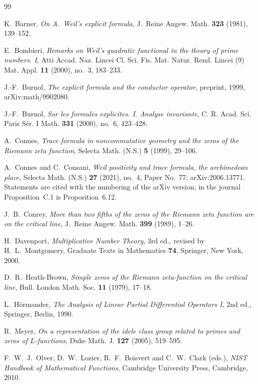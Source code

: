 \documentclass[11pt]{amsart}
\theoremstyle{remark}
\numberwithin{equation}{section}
\begin{document}
\begin{thebibliography}{99}

 K.~Barner,
\emph{On A.~Weil's explicit formula},
J.~Reine Angew. Math. \textbf{323} (1981), 139--152.

E.~Bombieri, \emph{Remarks on Weil's quadratic functional in the theory of
prime numbers. I}, Atti Accad. Naz. Lincei Cl. Sci. Fis. Mat. Natur. Rend.
Lincei (9) Mat. Appl. \textbf{11} (2000), no.~3, 183--233.

J.-F.~Burnol, \emph{The explicit formula and the conductor operator},
preprint, 1999, arXiv:math/9902080.

J.-F.~Burnol, \emph{Sur les formules explicites. I. Analyse invariante},
C. R. Acad. Sci. Paris S\'er. I Math. \textbf{331} (2000), no.~6, 423--428.

 A.~Connes,
\emph{Trace formula in noncommutative geometry and the zeros of the Riemann
zeta function}, Selecta Math. (N.S.) \textbf{5} (1999), 29--106.

A.~Connes and C.~Consani, \emph{Weil positivity and trace formula, the
archimedean place}, Selecta Math. (N.S.) \textbf{27} (2021), no.~4, Paper
No.~77; arXiv:2006.13771.  Statements are cited with the numbering of the
arXiv version; in the journal Proposition~C.1 is Proposition~6.12.

J.~B.~Conrey, \emph{More than two fifths of the zeros of the Riemann zeta
function are on the critical line}, J.~Reine Angew. Math. \textbf{399}
(1989), 1--26.

 H.~Davenport,
\emph{Multiplicative Number Theory}, 3rd ed., revised by
H.~L.~Montgomery, Graduate Texts in Mathematics \textbf{74}, Springer, New York, 2000.

D.~R.~Heath-Brown, \emph{Simple zeros of the Riemann zeta-function on the
critical line}, Bull. London Math. Soc. \textbf{11} (1979), 17--18.

L.~H\"ormander, \emph{The Analysis of Linear Partial Differential Operators
I}, 2nd ed., Springer, Berlin, 1990.

R.~Meyer, \emph{On a representation of the idele class group related to
primes and zeros of $L$-functions}, Duke Math. J. \textbf{127} (2005),
519--595.

 F.~W.~J.~Olver, D.~W.~Lozier, R.~F.~Boisvert and C.~W.~Clark
(eds.), \emph{NIST Handbook of Mathematical Functions},
Cambridge University Press, Cambridge, 2010.


\end{thebibliography}
\end{document}
